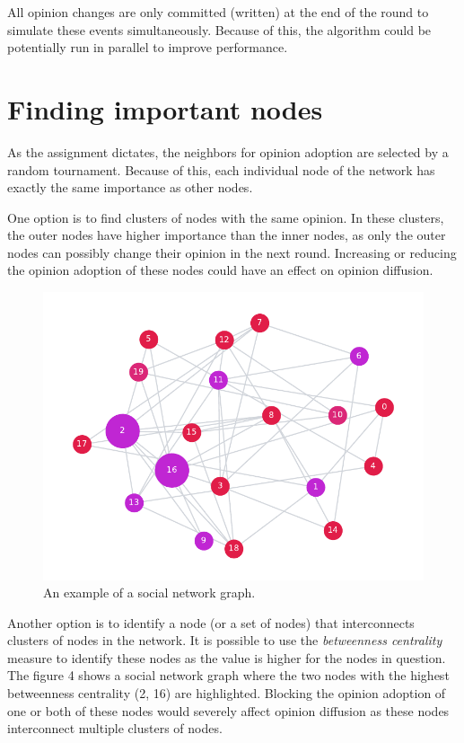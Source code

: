 \documentclass[11pt]{article}
\begin{document}
\noindent All opinion changes are only committed (written) at the end of the round to simulate these events simultaneously. Because of this, the algorithm could be potentially run in parallel to improve performance.

\section{Finding important nodes}
\label{Section:Finding}

As the assignment dictates, the neighbors for opinion adoption are selected by a random tournament. Because of this, each individual node of the network has exactly the same importance as other nodes.

\medskip

\noindent One option is to find clusters of nodes with the same opinion. In these clusters, the outer nodes have higher importance than the inner nodes, as only the outer nodes can possibly change their opinion in the next round. Increasing or reducing the opinion adoption of these nodes could have an effect on opinion diffusion.

\begin{figure}[H]
  \centering
  \includegraphics[width=\linewidth]{snapshot-labeled}
  \caption{An example of a social network graph.}
\end{figure}

\noindent Another option is to identify a node (or a set of nodes) that interconnects clusters of nodes in the network. It is possible to use the \emph{betweenness centrality} measure to identify these nodes as the value is higher for the nodes in question. The figure 4 shows a social network graph where the two nodes with the highest betweenness centrality (2, 16) are highlighted. Blocking the opinion adoption of one or both of these nodes would severely affect opinion diffusion as these nodes interconnect multiple clusters of nodes.
\end{document}
